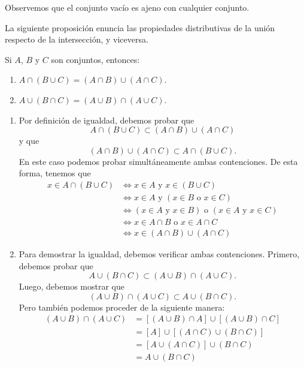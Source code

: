 Observemos que el conjunto vacío es ajeno con cualquier conjunto.

La siguiente proposición enuncia las propiedades distributivas de la unión respecto de la intersección, y viceversa.

\begin{prop}{}{}
    Si $A$, $B$ y $C$ son conjuntos, entonces:
    \begin{enumerate}[label=\roman*., topsep=6pt, itemsep=0pt]
        \item $A \cap(B \cup C) = (A \cap B) \cup(A \cap C)$.
        \item $A \cup(B \cap C) = (A \cup B) \cap(A \cup C)$.
    \end{enumerate}
    \tcblower
    \demostracion
    \begin{enumerate}[label=\roman*., topsep=6pt, itemsep=0pt]
        \item Por definición de igualdad, debemos probar que
        $$A \cap(B \cup C) \subset(A \cap B) \cup(A \cap C)$$
        y que
        $$(A \cap B) \cup(A \cap C) \subset A \cap(B \cup C).$$
        En este caso podemos probar simultáneamente ambas contenciones. De esta forma, tenemos que
        \begin{align*}
            x \in A \cap(B \cup C) & \Longleftrightarrow x \in A \text { y } x \in(B \cup C) \\ 
            & \Longleftrightarrow x \in A \text { y }(x \in B \text { o } x \in C) \\ 
            & \Longleftrightarrow (x \in A \text { y } x \in B) \text { o }(x \in A \text { y } x \in C) \\ 
            & \Longleftrightarrow x \in A \cap B \text { o } x \in A \cap C \\ 
            & \Longleftrightarrow x \in(A \cap B) \cup(A \cap C)
        \end{align*}
        \item Para demostrar la igualdad, debemos verificar ambas contenciones. Primero, debemos probar que
        $$A \cup(B \cap C) \subset (A \cup B) \cap (A \cup C).$$
        Luego, debemos mostrar que
        $$(A \cup B) \cap (A \cup C) \subset A \cup(B \cap C).$$
        Pero también podemos proceder de la siguiente manera:
        \begin{align*}
            (A \cup B) \cap(A \cup C) & =[(A \cup B) \cap A] \cup[(A \cup B) \cap C] \\
            & =[A] \cup[(A \cap C) \cup(B \cap C)] \\
            & =[A \cup(A \cap C)] \cup(B \cap C) \\
            & =A \cup(B \cap C)
        \end{align*}
    \end{enumerate}
\end{prop}

